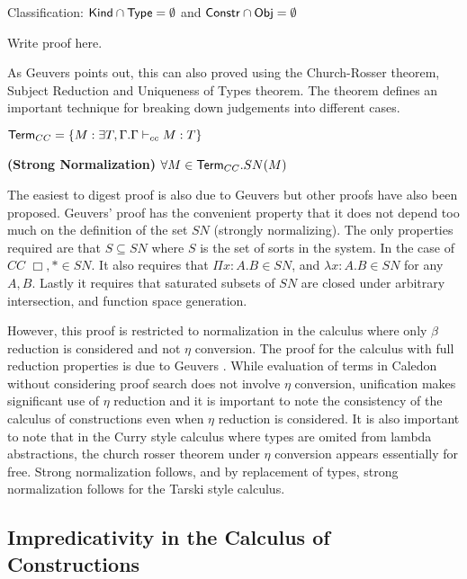 \begin{theorem}
Classification:
$\mathsf{Kind}\cap \mathsf{Type} = \emptyset$ 
and
$\mathsf{Constr}\cap \mathsf{Obj} = \emptyset$ 
\end{theorem}

Write proof here.

As Geuvers points out, this can also proved using the Church-Rosser theorem, 
Subject Reduction and Uniqueness of Types theorem.  
The theorem defines an important technique for breaking down judgements into
different cases.

\begin{definition}
$ \mathsf{Term}_{CC}  = \{ M : \exists T,\Gamma . \Gamma \vdash_{cc} M : T \}$
\end{definition}

\begin{theorem}
\textbf{(Strong Normalization)} $\forall M \in \mathsf{Term}_{CC}. SN(M)$
\end{theorem}

The easiest to digest proof is also due to Geuvers \citep{Geuvers94ashort} 
but other proofs have also been proposed.  Geuvers' proof has the convenient
property that it does not depend too much on the definition of the set $SN$ 
(strongly normalizing). The only properties required are that $S \subseteq SN$ 
where $S$ is the set of sorts in the system. In the case of $CC$ $\Box,* \in SN$.
It also requires that $\Pi x : A . B \in SN$, and $\lambda x : A . B \in SN$ 
for any $A,B$.  Lastly it requires that saturated subsets of $SN$ are closed under
arbitrary intersection, and function space generation.

However, this proof is restricted to normalization in the calculus where only $\beta$ reduction 
is considered and not $\eta$ conversion.  The proof for the calculus with full reduction properties is due
to Geuvers \citep{geuvers1993logics}.  While evaluation of terms in Caledon without considering proof search does
not involve $\eta$ conversion, unification makes significant use of $\eta$ reduction and it is important to note
the consistency of the calculus of constructions even when $\eta$ reduction is considered.  
It is also important to note that in the Curry style calculus where types are omited from lambda abstractions, 
the church rosser theorem under $\eta$ conversion appears essentially for free\citep{miquel2001implicit}. Strong normalization 
follows, and by replacement of types, strong normalization follows for the Tarski style calculus.


\subsection{Impredicativity in the Calculus of Constructions}

